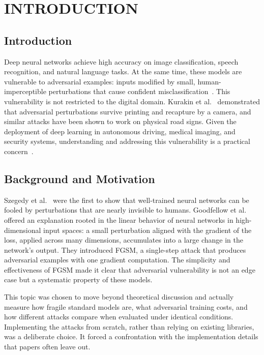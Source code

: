 \chapter{INTRODUCTION}
\label{ch:introduction}

\section{Introduction}

Deep neural networks achieve high accuracy on image classification, speech recognition, and natural language tasks. At the same time, these models are vulnerable to adversarial examples: inputs modified by small, human-imperceptible perturbations that cause confident misclassification~\cite{szegedy2014intriguing,goodfellow2015explaining}. This vulnerability is not restricted to the digital domain. Kurakin et al.~\cite{kurakin2016adversarialphysical} demonstrated that adversarial perturbations survive printing and recapture by a camera, and similar attacks have been shown to work on physical road signs. Given the deployment of deep learning in autonomous driving, medical imaging, and security systems, understanding and addressing this vulnerability is a practical concern~\cite{yuan2019adversarial,ren2020adversarial,chakraborty2018survey,zhou2022adversarial,macas2024adversarial}.

\section{Background and Motivation}

Szegedy et al.~\cite{szegedy2014intriguing} were the first to show that well-trained neural networks can be fooled by perturbations that are nearly invisible to humans. Goodfellow et al.~\cite{goodfellow2015explaining} offered an explanation rooted in the linear behavior of neural networks in high-dimensional input spaces: a small perturbation aligned with the gradient of the loss, applied across many dimensions, accumulates into a large change in the network's output. They introduced FGSM, a single-step attack that produces adversarial examples with one gradient computation. The simplicity and effectiveness of FGSM made it clear that adversarial vulnerability is not an edge case but a systematic property of these models.

This topic was chosen to move beyond theoretical discussion and actually measure how fragile standard models are, what adversarial training costs, and how different attacks compare when evaluated under identical conditions. Implementing the attacks from scratch, rather than relying on existing libraries, was a deliberate choice. It forced a confrontation with the implementation details that papers often leave out.

